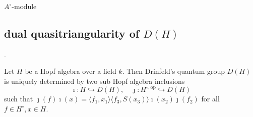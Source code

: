 \begin{proposition}
    \(
    A^\circ\text{-module}
    \)
\end{proposition}


\subsection*{dual quasitriangularity of $D(H)$}.

Let $H$ be a Hopf algebra over a field $k$.
Then Drinfeld's quantum group $D(H)$ is uniquely determined by two sub Hopf algebra inclusions
\[
\imath: H \hookrightarrow D(H), \quad \jmath: H^{\circ, \text{op}} \hookrightarrow D(H)
\]
such that $\jmath(f)\imath(x) = \langle f_1, x_1 \rangle \langle f_3, S(x_3) \rangle \imath(x_2) \jmath(f_2)$ for all $f \in H^\circ, x \in H$.



    
